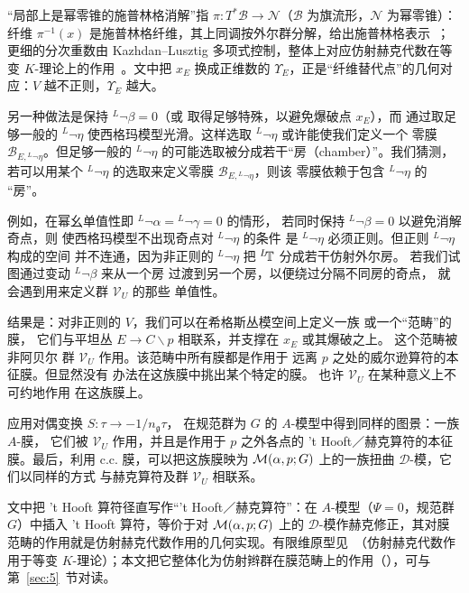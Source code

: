 \begin{yizhu}[物理图像补充]“局部上是幂零锥的施普林格消解”指 $\pi:T^*\mathcal B\to\mathcal N$（$\mathcal B$ 为旗流形，$\mathcal N$ 为幂零锥）：纤维 $\pi^{-1}(x)$ 是施普林格纤维，其上同调按外尔群分解，给出施普林格表示~\cite{ref26}；更细的分次重数由 Kazhdan--Lusztig 多项式控制，整体上对应仿射赫克代数在等变 $K$-理论上的作用~\cite{ref27,ref28}。文中把 $x_E$ 换成正维数的 $\Upsilon_E$，正是“纤维替代点”的几何对应：$V$ 越不正则，$\Upsilon_E$ 越大。\end{yizhu}

另一种做法是保持 ${}^L\neg\beta=0$（或
取得足够特殊，以避免爆破点 $x_E$），而
通过取足够一般的 ${}^L\neg\eta$ 使西格玛模型光滑。这样选取
${}^L\neg\eta$ 或许能使我们定义一个
零膜 ${\mathcal B}_{E,{}^L\neg\eta}$。但足够一般的
${}^L\neg\eta$ 的可能选取被分成若干“房（chamber）”。我们猜测，若可以用某个
${}^L\neg\eta$ 的选取来定义零膜 ${\mathcal B}_{E,{}^L\neg\eta}$，则该
零膜依赖于包含 ${}^L\neg\eta$ 的
“房”。

例如，在幂幺单值性即 ${}^L\neg\alpha={}^L\neg\gamma=0$ 的情形，
若同时保持 ${}^L\neg\beta=0$ 以避免消解奇点，则
使西格玛模型不出现奇点对 ${}^L\neg\eta$ 的条件
是 ${}^L\neg\eta$ 必须正则。但正则 ${}^L\neg\eta$ 构成的空间
并不连通，因为非正则的 ${}^L\neg\eta$ 把 ${}^L\negthinspace{\mathbb{T}}$
分成若干仿射外尔房。
若我们试图通过变动 ${}^L\neg\beta$ 来从一个房
过渡到另一个房，以便绕过分隔不同房的奇点，
就会遇到用来定义群 ${\mathcal V}_U$ 的那些
单值性。

结果是：对非正则的 $V$，我们可以在希格斯丛模空间上定义一族
或一个“范畴”的膜，
它们与平坦丛 $E\to C\backslash p$ 相联系，并支撑在 $x_E$ 或其爆破之上。
这个范畴被非阿贝尔
群 ${\mathcal V}_U$ 作用。该范畴中所有膜都是作用于
远离 $p$ 之处的威尔逊算符的本征膜。但显然没有
办法在这族膜中挑出某个特定的膜。
也许 ${\mathcal V}_U$ 在某种意义上不可约地作用
在这族膜上。

应用对偶变换 $S:\tau\to -1/n_{\mathfrak g}\tau$，
在规范群为 $G$ 的 $A$-模型中得到同样的图景：一族 $A$-膜，
它们被 $\mathcal V_U$ 作用，并且是作用于 $p$ 之外各点的
't Hooft／赫克算符的本征膜。最后，利用 c.c. 膜，可以把这族膜映为
${\mathcal{M}}(\alpha,p;G)$ 上的一族扭曲 ${\mathcal D}$-模，它们以同样的方式
与赫克算符及群 $\mathcal V_U$ 相联系。

\begin{yizhu}[易错点]文中把 't Hooft 算符径直写作“'t Hooft／赫克算符”：在 $A$-模型（$\Psi=0$，规范群 $G$）中插入 't Hooft 算符，等价于对 ${\mathcal{M}}(\alpha,p;G)$ 上的 $\mathcal D$-模作赫克修正，其对膜范畴的作用就是仿射赫克代数作用的几何实现。有限维原型见~\cite{ref27,ref28}（仿射赫克代数作用于等变 $K$-理论）；本文把它整体化为仿射辫群在膜范畴上的作用（\cite{ref29}），可与第~\ref{sec:5}~节对读。\end{yizhu}

